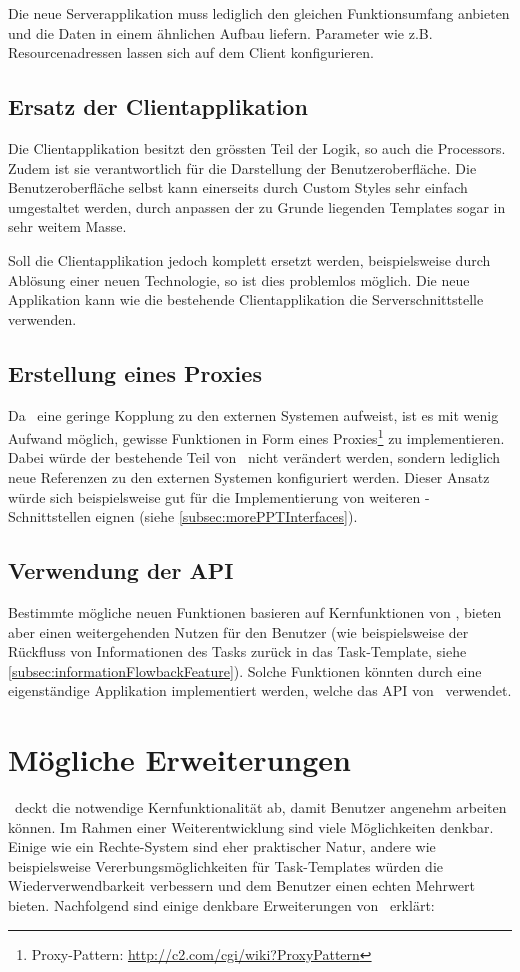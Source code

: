 			Die neue Serverapplikation muss lediglich den gleichen Funktionsumfang anbieten und die Daten in einem ähnlichen Aufbau liefern.
			Parameter wie z.B. Resourcenadressen lassen sich auf dem Client konfigurieren. 
	
		\subsection{Ersatz der Clientapplikation}
			Die Clientapplikation besitzt den grössten Teil der Logik, so auch die Processors.
			Zudem ist sie verantwortlich für die Darstellung der Benutzeroberfläche.
			Die Benutzeroberfläche selbst kann einerseits durch Custom Styles sehr einfach umgestaltet werden, durch anpassen der zu Grunde liegenden Templates sogar in sehr weitem Masse.
			
			Soll die Clientapplikation jedoch komplett ersetzt werden, beispielsweise durch Ablösung einer neuen Technologie, so ist dies problemlos möglich.
			Die neue Applikation kann wie die bestehende Clientapplikation die Serverschnittstelle verwenden.
			

		\subsection{Erstellung eines Proxies}
			Da \eeppi\ eine geringe Kopplung zu den externen Systemen aufweist,
			 ist es mit wenig Aufwand möglich,
			gewisse Funktionen in Form eines Proxies\footnote{Proxy-Pattern: \url{http://c2.com/cgi/wiki?ProxyPattern}} zu implementieren.
			Dabei würde der bestehende Teil von \eeppi\ nicht verändert werden,
			sondern lediglich neue Referenzen zu den externen Systemen konfiguriert werden.
			Dieser Ansatz würde sich beispielsweise gut für die Implementierung von weiteren \ppt-Schnittstellen eignen (siehe \ref{subsec:morePPTInterfaces}).
			
		\subsection{Verwendung der API}
			Bestimmte mögliche neuen Funktionen basieren auf Kernfunktionen von \eeppi,
			bieten aber einen weitergehenden Nutzen für den Benutzer
			(wie beispielsweise der Rückfluss von Informationen des Tasks zurück in das Task-Template, siehe \ref{subsec:informationFlowbackFeature}).
			Solche Funktionen könnten durch eine eigenständige Applikation implementiert werden,
			welche das API von \eeppi\ verwendet.


	\section{Mögliche Erweiterungen}
	\label{sec:possibleExtensions}
		\eeppi\ deckt die notwendige Kernfunktionalität ab, damit Benutzer angenehm arbeiten können.
		Im Rahmen einer Weiterentwicklung sind viele Möglichkeiten denkbar. 
		Einige wie ein Rechte-System sind eher praktischer Natur, 
		andere wie beispielsweise Vererbungsmöglichkeiten für Task-Templates würden die Wiederverwendbarkeit verbessern und dem Benutzer einen echten Mehrwert bieten.
		Nachfolgend sind einige denkbare Erweiterungen von \eeppi\ erklärt:
		
